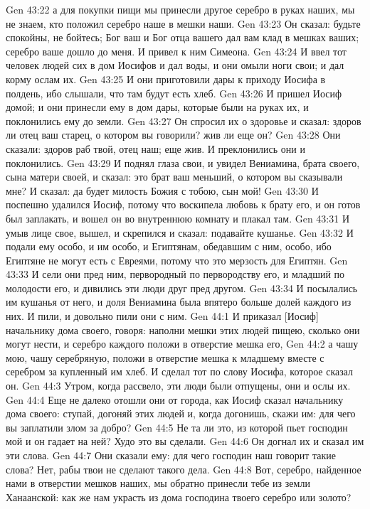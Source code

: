 Gen 43:22  а для покупки пищи мы принесли другое серебро в руках наших, мы не знаем, кто положил серебро наше в мешки наши.
Gen 43:23  Он сказал: будьте спокойны, не бойтесь; Бог ваш и Бог отца вашего дал вам клад в мешках ваших; серебро ваше дошло до меня. И привел к ним Симеона.
Gen 43:24  И ввел тот человек людей сих в дом Иосифов и дал воды, и они омыли ноги свои; и дал корму ослам их.
Gen 43:25  И они приготовили дары к приходу Иосифа в полдень, ибо слышали, что там будут есть хлеб.
Gen 43:26  И пришел Иосиф домой; и они принесли ему в дом дары, которые были на руках их, и поклонились ему до земли.
Gen 43:27  Он спросил их о здоровье и сказал: здоров ли отец ваш старец, о котором вы говорили? жив ли еще он?
Gen 43:28  Они сказали: здоров раб твой, отец наш; еще жив. И преклонились они и поклонились.
Gen 43:29  И поднял глаза свои, и увидел Вениамина, брата своего, сына матери своей, и сказал: это брат ваш меньший, о котором вы сказывали мне? И сказал: да будет милость Божия с тобою, сын мой!
Gen 43:30  И поспешно удалился Иосиф, потому что воскипела любовь к брату его, и он готов был заплакать, и вошел он во внутреннюю комнату и плакал там.
Gen 43:31  И умыв лице свое, вышел, и скрепился и сказал: подавайте кушанье.
Gen 43:32  И подали ему особо, и им особо, и Египтянам, обедавшим с ним, особо, ибо Египтяне не могут есть с Евреями, потому что это мерзость для Египтян.
Gen 43:33  И сели они пред ним, первородный по первородству его, и младший по молодости его, и дивились эти люди друг пред другом.
Gen 43:34  И посылались им кушанья от него, и доля Вениамина была впятеро больше долей каждого из них. И пили, и довольно пили они с ним.
Gen 44:1  И приказал [Иосиф] начальнику дома своего, говоря: наполни мешки этих людей пищею, сколько они могут нести, и серебро каждого положи в отверстие мешка его,
Gen 44:2  а чашу мою, чашу серебряную, положи в отверстие мешка к младшему вместе с серебром за купленный им хлеб. И сделал тот по слову Иосифа, которое сказал он.
Gen 44:3  Утром, когда рассвело, эти люди были отпущены, они и ослы их.
Gen 44:4  Еще не далеко отошли они от города, как Иосиф сказал начальнику дома своего: ступай, догоняй этих людей и, когда догонишь, скажи им: для чего вы заплатили злом за добро?
Gen 44:5  Не та ли это, из которой пьет господин мой и он гадает на ней? Худо это вы сделали.
Gen 44:6  Он догнал их и сказал им эти слова.
Gen 44:7  Они сказали ему: для чего господин наш говорит такие слова? Нет, рабы твои не сделают такого дела.
Gen 44:8  Вот, серебро, найденное нами в отверстии мешков наших, мы обратно принесли тебе из земли Ханаанской: как же нам украсть из дома господина твоего серебро или золото?

